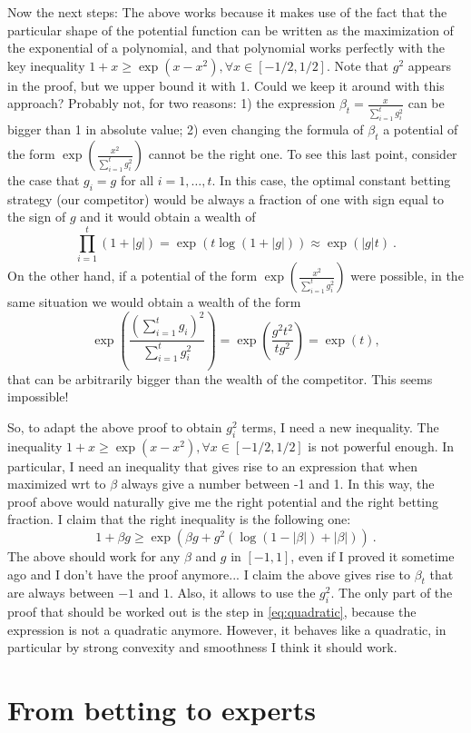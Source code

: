 \documentclass{article}
\begin{document}
Now the next steps: The above works because it makes use of the fact that the particular shape of the potential function can be written as the maximization of the exponential of a polynomial, and that polynomial works perfectly with the key inequality $1+x\geq \exp(x-x^2), \forall x \in [-1/2,1/2]$. Note that $g^2$ appears in the proof, but we upper bound it with 1. Could we keep it around with this approach? Probably not, for two reasons: 1) the expression $\beta_t=\frac{x}{\sum_{i=1}^t g_i^2}$ can be bigger than 1 in absolute value; 2) even changing the formula of $\beta_t$ a potential of the form $\exp(\frac{x^2}{\sum_{i=1}^t g_i^2})$ cannot be the right one. To see this last point, consider the case that $g_i=g$ for all $i=1,\dots, t$. In this case, the optimal constant betting strategy (our competitor) would be always a fraction of one with sign equal to the sign of $g$ and it would obtain a wealth of 
\[
\prod_{i=1}^t (1+|g|) 
= \exp( t \log(1+|g|)) 
\approx \exp(|g| t)~. 
\]
On the other hand, if a potential of the form $\exp(\frac{x^2}{\sum_{i=1}^t g_i^2})$ were possible, in the same situation we would obtain a wealth of the form
\[
\exp(\frac{(\sum_{i=1}^t g_i)^2}{\sum_{i=1}^t g_i^2})
= \exp(\frac{g^2 t^2}{t g^2})
= \exp(t),
\]
that can be arbitrarily bigger than the wealth of the competitor. This seems impossible!

So, to adapt the above proof to obtain $g_i^2$ terms, I need a new inequality. The inequality $1+x\geq \exp(x-x^2), \forall x \in [-1/2,1/2]$ is not powerful enough. In particular, I need an inequality that gives rise to an expression that when maximized wrt to $\beta$ always give a number between -1 and 1. In this way, the proof above would naturally give me the right potential and the right betting fraction.
I claim that the right inequality is the following one:
\[
1+\beta g \geq \exp\left(\beta g + g^2\left(\log(1-|\beta|)+|\beta|\right)\right)~.
\]
The above should work for any $\beta$ and $g$ in $[-1,1]$, even if I proved it sometime ago and I don't have the proof anymore...
I claim the above gives rise to $\beta_t$ that are always between $-1$ and $1$. Also, it allows to use the $g_i^2$. The only part of the proof that should be worked out is the step in \eqref{eq:quadratic}, because the expression is not a quadratic anymore. However, it behaves like a quadratic, in particular by strong convexity and smoothness I think it should work.

\section{From betting to experts}
\end{document}
